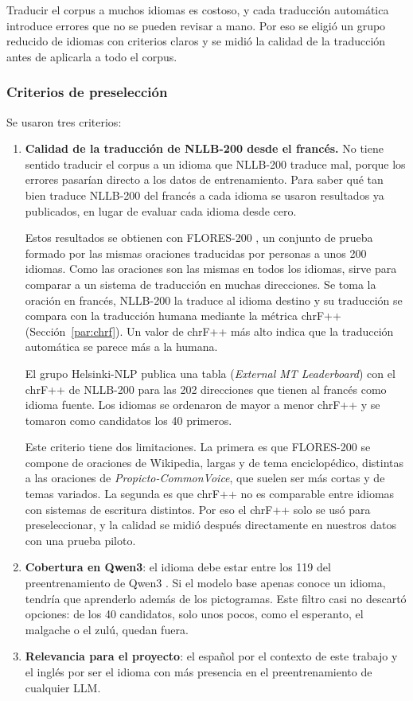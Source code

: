Traducir el corpus a muchos idiomas es costoso, y cada traducción automática introduce errores que no se pueden revisar a mano. Por eso se eligió un grupo reducido de idiomas con criterios claros y se midió la calidad de la traducción antes de aplicarla a todo el corpus.
 
\subsubsection{Criterios de preselección}
Se usaron tres criterios:
\begin{enumerate}
    \item \textbf{Calidad de la traducción de NLLB-200 desde el francés.} No tiene sentido traducir el corpus a un idioma que NLLB-200 traduce mal, porque los errores pasarían directo a los datos de entrenamiento. Para saber qué tan bien traduce NLLB-200 del francés a cada idioma se usaron resultados ya publicados, en lugar de evaluar cada idioma desde cero.
 
    Estos resultados se obtienen con FLORES-200 \cite{nllbteamNoLanguageLeft2022}, un conjunto de prueba formado por las mismas oraciones traducidas por personas a unos 200 idiomas. Como las oraciones son las mismas en todos los idiomas, sirve para comparar a un sistema de traducción en muchas direcciones. Se toma la oración en francés, NLLB-200 la traduce al idioma destino y su traducción se compara con la traducción humana mediante la métrica chrF++ (Sección~\ref{par:chrf}). Un valor de chrF++ más alto indica que la traducción automática se parece más a la humana.
 
    El grupo Helsinki-NLP publica una tabla (\textit{External MT Leaderboard}) con el chrF++ de NLLB-200 para las 202 direcciones que tienen al francés como idioma fuente. %
    Los idiomas se ordenaron de mayor a menor chrF++ y se tomaron como candidatos los 40 primeros.
 
    Este criterio tiene dos limitaciones. La primera es que FLORES-200 se compone de oraciones de Wikipedia, largas y de tema enciclopédico, distintas a las oraciones de \textit{Propicto-CommonVoice}, que suelen ser más cortas y de temas variados. La segunda es que chrF++ no es comparable entre idiomas con sistemas de escritura distintos. Por eso el chrF++ solo se usó para preseleccionar, y la calidad se midió después directamente en nuestros datos con una prueba piloto.
 
    \item \textbf{Cobertura en Qwen3}: el idioma debe estar entre los 119 del preentrenamiento de Qwen3 \cite{yang2025qwen3}. Si el modelo base apenas conoce un idioma, tendría que aprenderlo además de los pictogramas. Este filtro casi no descartó opciones: de los 40 candidatos, solo unos pocos, como el esperanto, el malgache o el zulú, quedan fuera.
    \item \textbf{Relevancia para el proyecto}: el español por el contexto de este trabajo y el inglés por ser el idioma con más presencia en el preentrenamiento de cualquier LLM.
\end{enumerate}
 

